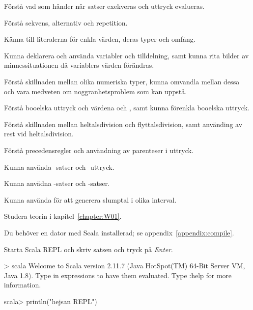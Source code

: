 
\Exercise{\ExeWeekONE}\label{exe:W01}

\begin{Goals}
\item Förstå vad som händer när satser exekveras och uttryck evalueras.
\item Förstå sekvens, alternativ och repetition.
\item Känna till literalerna för enkla värden, deras typer och omfång.
\item Kunna deklarera och använda variabler och tilldelning, samt kunna rita bilder av minnessituationen då variablers värden förändras.
\item Förstå skillnaden mellan olika numeriska typer, kunna omvandla mellan dessa och vara medveten om noggranhetsproblem som kan uppstå.
\item Förstå booelska uttryck och värdena  och , samt kunna förenkla booelska uttryck.
\item Förstå skillnaden mellan heltalsdivision och flyttalsdivision, samt använding av rest vid heltalsdivision.
\item Förstå precedensregler och användning av parenteser i uttryck.
\item Kunna använda -satser och -uttryck.
\item Kunna anvädna -satser och -satser.
\item Kunna använda  för att generera slumptal i olika interval.
\end{Goals}

\begin{Preparations}
\item Studera teorin i kapitel~\ref{chapter:W01}.
\item Du behöver en dator med Scala installerad; se appendix~\ref{appendix:compile}.
\end{Preparations}

\BasicTasks

\Task Starta Scala REPL  och skriv satsen  och tryck på \textit{Enter}. 

\begin{REPLnonum}
> scala
Welcome to Scala version 2.11.7 (Java HotSpot(TM) 64-Bit Server VM, Java 1.8).
Type in expressions to have them evaluated.
Type :help for more information.

scala> println("hejsan REPL")
\end{REPLnonum}

